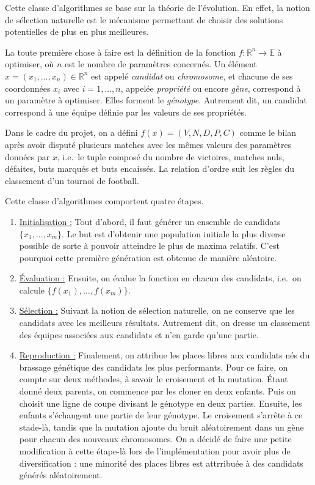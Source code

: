 \documentclass[12pt,a4paper]{article}
\begin{document}
Cette classe d'algorithmes se base sur la th\'eorie de l'\'evolution. En effet, 
la notion de s\'election naturelle est le m\'ecanisme permettant de choisir des 
solutions potentielles de plus en plus meilleures.

La toute premi\`ere chose \`a faire est la d\'efinition de la fonction 
$f: \mathbb{R}^n \to \mathbb{E}$ \`a optimiser, o\`u $n$ est le nombre de 
param\`etres concern\'es. Un \'el\'ement $x=(x_1,\dotsc,x_n) \in \mathbb{R}^n$ 
est appel\'e {\itshape candidat} ou {\itshape chromosome}, et chacune de ses 
coordonn\'ees $x_i$ avec $i=1,\dotsc,n$, appel\'ee {\itshape propri\'et\'e} 
ou encore {\itshape g\`ene}, correspond \`a un param\`etre \`a optimiser. Elles 
forment le {\itshape g\'enotype}.
Autrement dit, un candidat correspond \`a une \'equipe d\'efinie par les valeurs
de ses propri\'et\'es.

Dans le cadre du projet, on a d\'efini $f(x)=(V,N,D,P,C)$ comme le 
bilan apr\`es avoir disput\'e plusieurs matches avec les m\^emes valeurs des 
param\`etres donn\'ees par $x$, i.e.\ le tuple compos\'e du nombre de 
victoires, matches nuls, d\'efaites, buts marqu\'es et buts encaiss\'es. La 
relation d'ordre suit les r\`egles du classement d'un tournoi de football.

Cette classe d'algorithmes comportent quatre \'etapes.

\begin{enumerate}
  \item \underline{Initialisation :} Tout d'abord, il faut g\'en\'erer un 
  ensemble de candidats $\{x_1,\dotsc,x_m\}$. Le but est d'obtenir une 
  population initiale la plus diverse possible de sorte \`a pouvoir atteindre 
le plus de maxima relatifs. C'est pourquoi cette premi\`ere g\'en\'eration est 
obtenue de mani\`ere al\'eatoire.
  \item \underline{\'Evaluation :} Ensuite, on \'evalue la fonction en 
  chacun des candidats, i.e.\ on calcule $\{f(x_1),\dotsc,f(x_m)\}$.
  \item \underline{S\'election :} Suivant la notion de s\'election 
  naturelle, on ne conserve que les candidats avec les meilleurs r\'esultats. 
  Autrement dit, on dresse un classement des \'equipes associ\'ees aux 
  candidats et n'en garde qu'une partie.
  \item \underline{Reproduction :} Finalement, on attribue les places 
  libres aux candidats n\'es du brassage g\'en\'etique des candidats les 
  plus performants. Pour ce faire, on compte sur deux m\'ethodes, \`a savoir le 
  croisement et la mutation. \'Etant donn\'e deux parents, on commence par les 
  cloner en deux enfants. Puis on choisit une ligne de coupe divisant le 
  g\'enotype en deux parties. Ensuite, les enfants s'\'echangent une partie de 
  leur g\'enotype. Le croisement s'arr\^ete \`a ce stade-l\`a, tandis que la 
  mutation ajoute du bruit al\'eatoirement dans un g\`ene pour chacun 
  des nouveaux chromosomes. On a d\'ecid\'e de faire une petite modification 
  \`a cette \'etape-l\`a lors de l'impl\'ementation pour avoir plus de 
  diversification : une minorit\'e des places libres est attrribu\'ee \`a des 
  candidats g\'en\'er\'es al\'eatoirement.
\end{enumerate}
\end{document}
